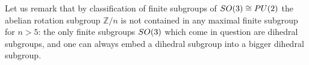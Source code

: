 \documentclass[11pt]{amsproc}
\theoremstyle{plain}
\theoremstyle{remark}
\newtheorem{remark}[theorem]{Remark}
\begin{document}
Let us remark that by classification of finite subgroups of $\rm{SO}(3) \cong \rm{PU}(2)$ the abelian rotation subgroup $\mathbb Z/n$ is not contained in any maximal finite subgroup for $n > 5$: the only finite subgroups $\rm{SO}(3)$ which come in question are dihedral subgroups, and one can always embed a dihedral subgroup into a bigger dihedral subgroup. 




\end{document}
